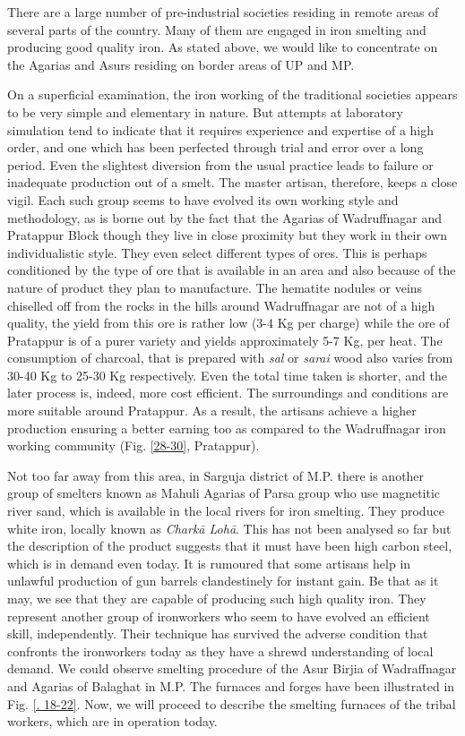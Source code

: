 There are a large number of pre-industrial societies residing in remote areas of several parts of the country. Many of them are engaged in iron smelting and producing good quality iron. As stated above, we would like to concentrate on the Agarias and Asurs residing on border areas of UP and MP. 

On a superficial examination, the iron working of the traditional societies appears to be very simple and elementary in nature. But attempts at laboratory simulation tend to indicate that it requires experience and expertise of a high order, and one which has been perfected through trial and error over a long period. Even the slightest diversion from the usual practice leads to failure or inadequate production out of a smelt. The master artisan, therefore, keeps a close vigil. Each such group seems to have evolved its own working style and methodology, as is borne out by the fact that the Agarias of Wadruffnagar and Pratappur Block though they live in close proximity but they work in their own individualistic style. They even select different types of ores. This is perhaps conditioned by the type of ore that is available in an area and also because of the nature of product they plan to manufacture. The hematite nodules or veins chiselled off from the rocks in the hills around Wadruffnagar are not of a high quality, the yield from this ore is rather low (3-4 Kg per charge) while the ore of Pratappur is of a purer variety and yields approximately 5-7 Kg, per heat. The consumption of charcoal, that is prepared with {\it sal} or {\it sarai} wood also varies from 30-40 Kg to 25-30 Kg respectively. Even the total time taken is shorter, and the later process is, indeed, more cost efficient. The surroundings and conditions are more suitable around Pratappur. As a result, the artisans achieve a higher production ensuring a better earning too as compared to the Wadruffnagar iron working community (Fig. \ref{28-30}, Pratappur).

Not too far away from this area, in Sarguja district of M.P. there is another group of smelters known as Mahuli Agarias of Parsa group who use magnetitic river sand, which is available in the local rivers for iron smelting. They produce white iron, locally known as {\it Charkā Lohā}. This has not been analysed so far but the description of the product suggests that it must have been high carbon steel, which is in demand even today. It is rumoured that some artisans help in unlawful production of gun barrels clandestinely for instant gain. Be that as it may, we see that they are capable of producing such high quality iron. They represent another group of ironworkers who seem to have evolved an efficient skill, independently. Their technique has survived the adverse condition that confronts the ironworkers today as they have a shrewd understanding of local demand. We could observe smelting procedure of the Asur Birjia of Wadraffnagar and Agarias of Balaghat in M.P. The furnaces and forges have been illustrated in Fig. \ref{. 18-22}. Now, we will proceed to describe the smelting furnaces of the tribal workers, which are in operation today.

